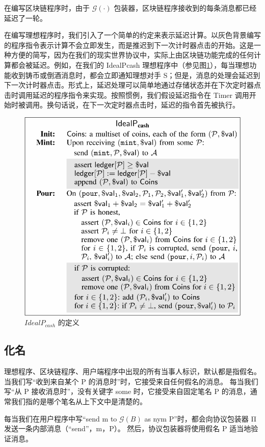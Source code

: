\documentclass{xduugtrans}
\begin{document}
在编写区块链程序时，由于 $\mathcal{G} ( \cdot )$ 包装器，区块链程序接收到的每条消息都已经延迟了一轮。

在编写理想程序时，我们引入了一个简单的约定来表示延迟计算。以灰色背景编写的程序指令表示计算不会立即发生，而是推迟到下一次计时器点击的开始。这是一种方便的简写，因为在我们的现实世界协议中，实际上由区块链功能完成的任何计算都会被延迟。例如，在我们的 IdealPcash 理想程序中（参见图\ref{fig3}），每当理想功能收到铸币或倒酒消息时，都会立即通知理想对手 S；但是，消息的处理会延迟到下一次计时器点击。形式上，延迟处理可以简单地通过存储状态并在下次定时器点击时调用延迟的程序指令来实现。按照惯例，我们假设延迟指令在 Timer 调用开始时被调用。换句话说，在下一次定时器点击时，延迟的指令首先被执行。

\begin{figure}
    \centering
    \includegraphics[width=.8\linewidth]{3}
    \caption{$IdealP_{cash}$ 的定义}
    \label{fig3}
\end{figure}

\subsection{化名}

理想程序、区块链程序、用户端程序中出现的所有当事人标识，默认都是指假名。 当我们写“收到来自某个 P 的消息时”时，它接受来自任何假名的消息。 每当我们写“从 P 接收消息时”，没有关键字 some 时，它接受来自固定笔名 P 的消息，通常我们指的是哪个笔名从上下文中是清楚的。

每当我们在用户程序中写“send m to $\mathcal{G} ( B )$ as nym P”时，都会向协议包装器 Π 发送一条内部消息（“send”，m，P）。 然后，协议包装器将使用假名 P 适当地验证消息。
\end{document}
